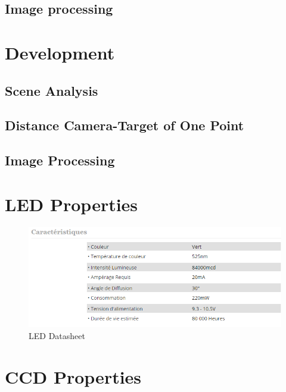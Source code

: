 \documentclass[12pt,a4paper,fleqn, onesside]{report}
\begin{document}
\section{Image processing}


\chapter{Development}
\section{Scene Analysis}



\section{Distance Camera-Target of One Point}

\section{Image Processing}



\appendix
\chapter{LED Properties}
\label{LEDdatasheet}
\begin{figure}[h]
  \centerline{\includegraphics[scale=0.8]{fig/LedDataSheet.png}}
  \caption{LED Datasheet}
  \label{fig:LEDdatasheet}
\end{figure}

\chapter{CCD Properties}
\label{CCDdatasheet}





\end{document}
